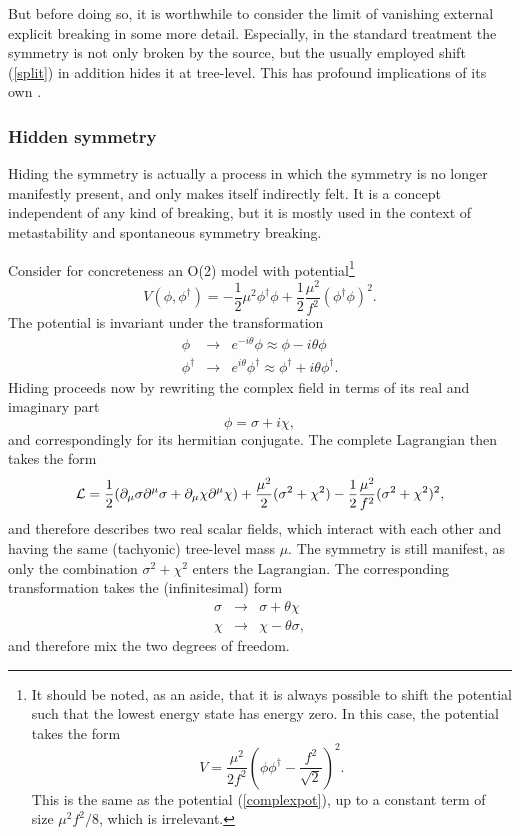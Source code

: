 \documentclass[final,12pt,3p,longtitle]{elsarticle}
\newcommand*{\La}{{\cal{L}}}
\newcommand*{\no}{\noindent}
\newcommand*{\bea}{\begin{eqnarray}}
\newcommand*{\eea}{\end{eqnarray}}
\newcommand*{\be}{\begin{equation}}
\newcommand*{\ee}{\end{equation}}
\newcommand*{\pd}{\partial}
\newcommand*{\pdm}{\pd_{\mu}}
\newcommand*{\pref}[1]{(\ref{#1})}
\newcommand*{\nn}{\nonumber}
\newcommand*{\1}{1\!\!\!\bot}
\begin{document}
But before doing so, it is worthwhile to consider the limit of vanishing external explicit breaking in some more detail. Especially, in the standard treatment the symmetry is not only broken by the source, but the usually employed shift \pref{split} in addition hides it at tree-level. This has profound implications of its own \cite{O'Raifeartaigh:1978kv}.

\subsubsection{Hidden symmetry}\label{sss:hidden}

Hiding \cite{O'Raifeartaigh:1978kv} the symmetry is actually a process in which the symmetry is no longer manifestly present, and only makes itself indirectly felt. It is a concept independent of any kind of breaking, but it is mostly used in the context of metastability and spontaneous symmetry breaking.

Consider for concreteness an O(2) model with potential\footnote{It should be noted, as an aside, that it is always possible to shift the potential such that the lowest energy state has energy zero. In this case, the potential takes the form
\be
V=\frac{\mu^2}{2f^2}\left(\phi\phi^\dagger-\frac{f^2}{\sqrt{2}}\right)^2.\label{o2model}
\ee
\no This is the same as the potential \pref{complexpot}, up to a constant term of size $\mu^2f^2/8$, which is irrelevant.}
\be
V(\phi,\phi^\dagger)=-\frac{1}{2}\mu^2\phi^\dagger\phi+\frac{1}{2}\frac{\mu^2}{f^2}(\phi^\dagger\phi)^2\label{complexpot}.
\ee
\no The potential is invariant under the transformation
\bea
\phi&\to& e^{-i\theta}\phi\approx\phi-i\theta\phi\nn\\
\phi^\dagger&\to& e^{i\theta}\phi^\dagger\approx\phi^\dagger+i\theta\phi^\dagger\nn.
\eea
\no Hiding proceeds now by rewriting the complex field in terms of its real and imaginary part
\be
\phi=\sigma+i\chi\nn,
\ee
\no and correspondingly for its hermitian conjugate. The complete Lagrangian then takes the form
\be
\La=\frac{1}{2}(\pdm\sigma\pd^\mu\sigma+\pdm\chi\pd^\mu\chi)+\frac{\mu^2}{2}(\sigma^2+\chi^2)-\frac{1}{2}\frac{\mu^2}{f^2}(\sigma^2+\chi^2)^2\nn,
\ee
\no and therefore describes two real scalar fields, which interact with each other and having the same (tachyonic) tree-level mass $\mu$. The symmetry is still manifest, as only the combination $\sigma^2+\chi^2$ enters the Lagrangian. The corresponding transformation takes the (infinitesimal) form
\bea
\sigma&\to&\sigma+\theta\chi\label{sxtrafo1}\\
\chi&\to&\chi-\theta\sigma\label{sxtrafo2},
\eea
\no and therefore mix the two degrees of freedom.
\end{document}
